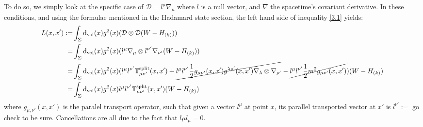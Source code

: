\documentclass[a4paper,11pt]{article}
\numberwithin{equation}{section}
\theoremstyle{definition}
\renewcommand{\d}{{\mathrm{d}}}
\begin{document}
To do so, we simply look at the specific case of $\mathcal{D}=l^\mu\nabla_\mu$ where $l$ is a null vector, and $\nabla$ the spacetime's covariant derivative. In these conditions, and using the formulae mentioned in the Hadamard state section, the left hand side of inequality \ref{3.1} yields:
\begin{align*}
    L(x,x'):=& \int_\Sigma \d_\mathrm{vol}(x) g^2(x) (\mathcal{D}\otimes\mathcal{D}(W-H_{(k)}))\\
    =& \int_\Sigma \d_\mathrm{vol}(x) g^2(x) (l^\mu\nabla_\mu\otimes l^{\nu'}\nabla_{\nu'}(W-H_{(k)}))\\
    =& \int_\Sigma \d_\mathrm{vol}(x) g^2(x) (l^\mu l^{\nu'}\mathbb{T}^\mathrm{split}_{\mu\nu'}(x,x')+\cancel{l^\mu l^{\nu'}\frac{1}{2}g_{\mu\nu'}(x,x')g^{\lambda\rho'}(x,x')\nabla_\lambda\otimes\nabla_{\rho'}}-\cancel{l^\mu l^{\nu'}\frac{1}{2}m^2g_{\mu\nu'}(x,x')})(W-H_{(k)})\\
    =& \int_\Sigma \d_\mathrm{vol}(x) g^2(x) l^\mu l^{\nu'}\mathbb{T}^\mathrm{split}_{\mu\nu'}(x,x')(W-H_{(k)})
\end{align*}
where $g_{\mu,\nu'}(x,x')$ is the paralel transport operator, such that given a vector $l^\mu$ at point $x$, its parallel transported vector at $x'$ is $l^{\nu'}:=$ \color{red} go check to be sure\color{black}. Cancellations are all due to the fact that $l\mu l_\mu=0$.
\end{document}
